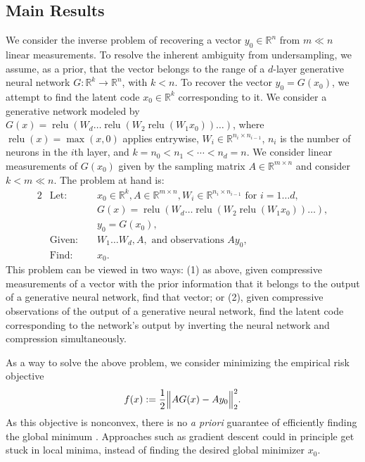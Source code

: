 \documentclass[final,12pt]{colt2018}
\newcommand{\R}{\mathbb{R}}
\newcommand{\xo}{x_0}
\newcommand{\Win}[1]{W_{#1}}
\newcommand{\Wi}{\Win{i}}
\DeclareMathOperator{\relu}{relu}
\begin{document}
\subsection{Main Results}

We consider the inverse problem of recovering a vector $y_0 \in \R^{n}$ from $m \ll n$ linear measurements. To resolve the inherent ambiguity from undersampling, we assume, as a prior, that the vector belongs to the range of a $d$-layer generative neural network $G: \R^k \to \R^{n}$, with $k<n$.  To recover the vector $y_0= G(\xo)$, we attempt to find the latent code $\xo \in \R^k$ corresponding to it.  
We consider a generative network modeled by $G(x) = \relu(\Win{d} \ldots \relu (\Win{2} \relu(\Win{1} \xo)) \ldots )$, where $\relu(x) = \max(x, 0)$ applies entrywise, $W_i \in \R^{n_i \times n_{i-1}}$, $n_i$ is the number of neurons in the $i$th layer, and $k=n_0 < n_1 < \cdots < n_d = n$.  
 We consider linear measurements of $G(\xo)$ given by the sampling matrix $A \in \R^{m \times n}$ and consider $k < m \ll n$.    The problem at hand is:
\begin{alignat*}{2}
	&\text{Let: } &&\xo \in \R^{k}, A\in \R^{m \times n}, \Wi \in \R^{n_i \times n_{i-1} } \text{ for } i=1\ldots d,\\
	& &&G(x) = \relu(\Win{d} \ldots \relu (\Win{2} \relu(\Win{1} \xo)) \ldots ),\\
	& &&y_0 = G(\xo),\\
	&\text{Given: } && W_1\ldots W_d, A,  \text{  and  observations  } A y_0 ,\\
	&\text{Find: } &&\xo.
\end{alignat*}
This problem can be viewed in two ways: (1) as above, given compressive measurements of a vector with the prior information that it belongs to the output of a generative neural network, find that vector;
or (2), given compressive observations of the output of a generative neural network, find the latent code corresponding to the network's output by inverting the neural network and compression simultaneously.  

As a way to solve the above problem, we consider minimizing the empirical risk objective
\begin{align}
f(x) := \frac{1}{2} \Bigl \| A G(x) - A y_0 \Bigr\|_2^2. \label{defn-f}
\end{align}
As this objective is nonconvex, there is no \textit{a priori} guarantee of efficiently finding the global minimum \citep{Murty1987}.   Approaches such as gradient descent could in principle get stuck in local minima, instead of finding the desired global minimizer $\xo$.  
\end{document}
